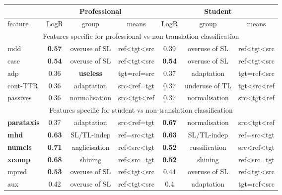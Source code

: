 \begin{longtable}[H]{p{1.84cm}|ccc||ccc}
	\toprule
	&      \multicolumn{3}{c}{Professional} 	&      \multicolumn{3}{c}{Student}\\
	\midrule
	feature & LogR & group & means   & LogR & group   & means   \\
	\midrule
	\multicolumn{7}{c}{Features specific for professional vs non-translation classification} \\
	\midrule
	mdd           & \textbf{0.57} & overuse of SL & ref\textless{}tgt\textless{}src & 0.39 & overuse of SL  & ref\textless{}tgt\textless{}src \\
	case          & \textbf{0.54} & overuse of SL & ref\textless{}tgt\textless{}src & \textbf{0.54} & overuse of SL  & ref\textless{}tgt\textless{}src \\
	adp           & 0.36 & \textbf{useless}       & tgt=ref=src                     & 0.37 & adaptation     & tgt=ref\textless{}src           \\
	cont-TTR  & 0.36 & adaptation    & src\textless{}ref=tgt           & 0.37 & underuse of TL & tgt\textless{}src\textless{}ref \\
	passives      & 0.36 & normalisation & src\textless{}tgt\textless{}ref & 0.37 & normalisation  & src\textless{}tgt\textless{}ref \\
	\midrule
	\multicolumn{7}{c}{Features specific for student vs non-translation classification} \\
	\midrule
	\textbf{parataxis}     & 0.37 & adaptation    & src\textless{}ref=tgt           & \textbf{0.67} & normalisation & src\textless{}tgt\textless{}ref \\
	\textbf{mhd}           & \textbf{0.63} & SL/TL-indep   & ref=src\textless{}tgt           & \textbf{0.63} & SL/TL-indep   & ref=src\textless{}tgt           \\
	\textbf{numcls}        & \textbf{0.71} & anglicisation & ref\textless{}src\textless{}tgt & \textbf{0.52} & russification & src\textless{}ref\textless{}tgt \\
	\textbf{xcomp}         & \textbf{0.68} & shining       & ref\textless{}src=tgt           & \textbf{0.52} & shining       & ref\textless{}src=tgt           \\
	mpred         & \textbf{0.53} & overuse of SL & ref\textless{}tgt\textless{}src & 0.44 & overuse of SL & ref\textless{}tgt\textless{}src \\
	aux           & 0.42 & overuse of SL & ref\textless{}tgt\textless{}src & 0.4  & adaptation    & tgt=ref\textless{}src           \\

\end{longtable}
